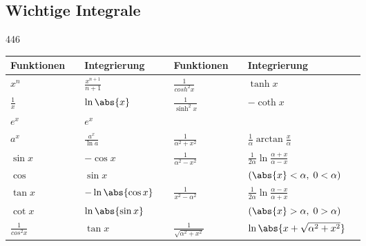 \subsection{Wichtige Integrale}{446}

\begin{tabular}{|ll|ll||ll|ll|}
    \hline
    Funktionen                                 && Integrierung                             && Funktionen                                 && Integrierung                                                    &\\
    \hline
    $ x^n$                                     && $ \frac{x^{n+1}}{n+1} $                  && $ \frac{1}{cosh^2 x} $                     && $ \tanh x $                                                     &\\
    $ \frac{1}{x} $                            && $ \ln \abs{x} $                          && $ \frac{1}{\sinh^2 x}$                     && $ -\coth x $                                                    &\\
    $ e^x $                                    && $ e^x $                                  &&                                            &&                                                                 &\\
    $ a^x $                                    && $ \frac{a^x}{\ln a} $                    && $ \frac{1}{\alpha^2 + x^2}$                && $ \frac{1}{\alpha} \arctan \frac{x}{\alpha} $                   &\\
    $ \sin x $                                 && $ -\cos x $                              && $ \frac{1}{\alpha^2 - x^2}$                && $ \frac{1}{2\alpha} \ln \frac{\alpha + x}{\alpha - x} $         &\\
    $ \cos $                                   && $ \sin x $                               &&                                            && $ (\abs{x} < \alpha, \; 0 < \alpha)$                            &\\
    $ \tan x $                                 && $ -\ln \abs{\cos x} $                    && $ \frac{1}{x^2 - \alpha^2}$                && $ \frac{1}{2\alpha} \ln \frac{\alpha - x}{\alpha + x} $         &\\
    $ \cot x $                                 && $ \ln \abs{\sin x}$                      &&                                            && $ (\abs{x} > \alpha, \; 0 > \alpha)$                            &\\
    $ \frac{1}{cos^2 x} $                      && $ \tan x $                               && $ \frac{1}{\sqrt{\alpha^2 + x^2}}$         && $ \ln \abs{x + \sqrt{\alpha^2 + x^2}}$                          &\\

\end{tabular}
